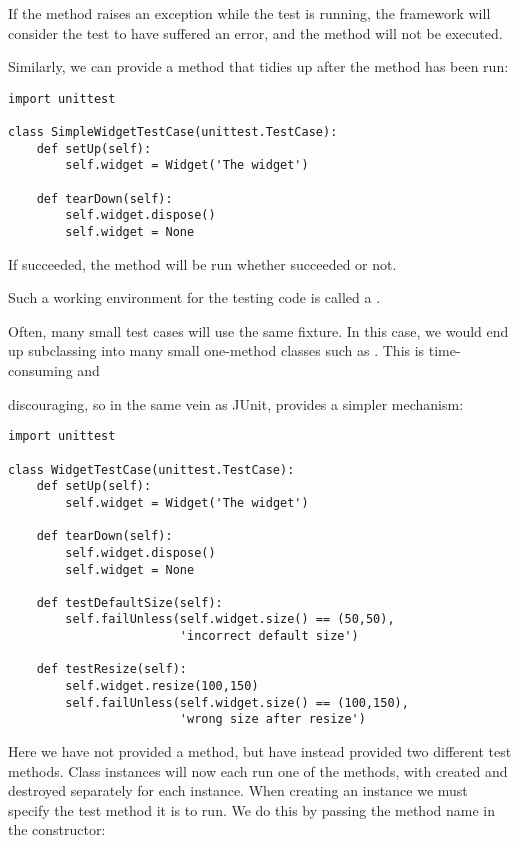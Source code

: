 If the  method raises an exception while the test is
running, the framework will consider the test to have suffered an
error, and the  method will not be executed.

Similarly, we can provide a  method that tidies up
after the  method has been run:

\begin{verbatim}
import unittest

class SimpleWidgetTestCase(unittest.TestCase):
    def setUp(self):
        self.widget = Widget('The widget')

    def tearDown(self):
        self.widget.dispose()
        self.widget = None
\end{verbatim}

If  succeeded, the  method will be
run whether  succeeded or not.

Such a working environment for the testing code is called a
.

Often, many small test cases will use the same fixture.  In this case,
we would end up subclassing  into many
small one-method classes such as
.  This is time-consuming and

discouraging, so in the same vein as JUnit,  provides
a simpler mechanism:

\begin{verbatim}
import unittest

class WidgetTestCase(unittest.TestCase):
    def setUp(self):
        self.widget = Widget('The widget')

    def tearDown(self):
        self.widget.dispose()
        self.widget = None

    def testDefaultSize(self):
        self.failUnless(self.widget.size() == (50,50),
                        'incorrect default size')

    def testResize(self):
        self.widget.resize(100,150)
        self.failUnless(self.widget.size() == (100,150),
                        'wrong size after resize')
\end{verbatim}

Here we have not provided a  method, but have
instead provided two different test methods.  Class instances will now
each run one of the   methods, with 
created and destroyed separately for each instance.  When creating an
instance we must specify the test method it is to run.  We do this by
passing the method name in the constructor:

